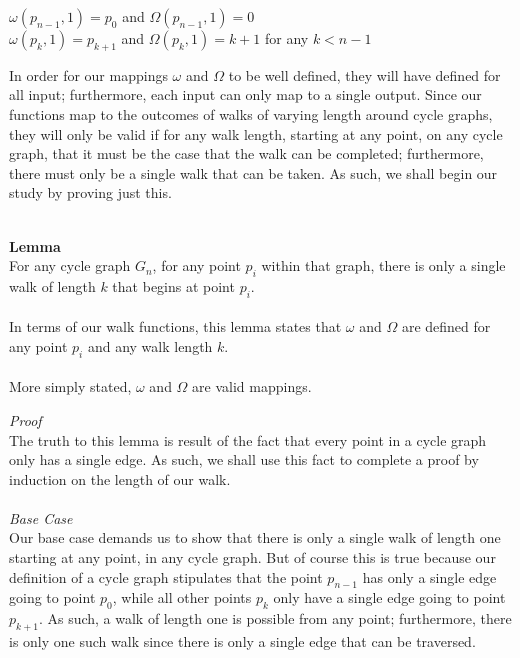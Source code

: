 \documentclass[a4paper,12pt]{article}
\begin{document}
\begin{center}
$\omega(p_{n-1}, 1) = p_0$ and $\Omega(p_{n-1}, 1) = 0$\\
$\omega(p_k, 1) = p_{k+1}$ and $\Omega(p_k, 1) = k + 1$ for any $k < n - 1$\\
\end{center}
\noindent
In order for our mappings $\omega$ and $\Omega$ to be well defined, they will have defined for all input; furthermore, each input can only map to a single output. Since our functions map to the outcomes of walks of varying length around cycle graphs, they will only be valid if for any walk length, starting at any point, on any cycle graph, that it must be the case that the walk can be completed; furthermore, there must only be a single walk that can be taken. As such, we shall begin our study by proving just this.\\
\\
\begin{tcolorbox}
\textbf{Lemma}\\
For any cycle graph $G_n$, for any point $p_i$ within that graph, there is only a single walk of length $k$ that begins at point $p_i$.\\
\\
In terms of our walk functions, this lemma states that $\omega$ and $\Omega$ are defined for any point $p_i$ and any walk length $k$.\\
\\
More simply stated, $\omega$ and $\Omega$ are valid mappings.
\end{tcolorbox}
\noindent
\textit{Proof}\\
The truth to this lemma is result of the fact that every point in a cycle graph only has a single edge. As such, we shall use this fact to complete a proof by induction on the length of our walk.\\
\\
\textit{Base Case}\\ 
Our base case demands us to show that there is only a single walk of length one starting at any point, in any cycle graph. But of course this is true because our definition of a cycle graph stipulates that the point $p_{n-1}$ has only a single edge going to point $p_0$, while all other points $p_k$ only have a single edge going to point $p_{k+1}$. As such, a walk of length one is possible from any point; furthermore, there is only one such walk since there is only a single edge that can be traversed.\\
\\
\end{document}
